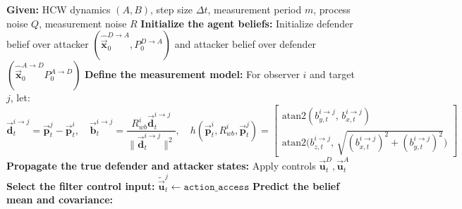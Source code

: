 \begin{algorithm}[H]
\caption{Agent-Centric Bearing-Only Kalman Filter Update}
\label{alg:kf-methodology}
\begin{algorithmic}[1]
\State \textbf{Given:} HCW dynamics $(A,B)$, step size $\Delta t$, measurement period $m$, process noise $Q$, measurement noise $R$
\State \textbf{Initialize the agent beliefs:}
\State \hspace{1em} Initialize defender belief over attacker $(\hat{\vec{\mathbf{x}}}^{D \to A}_0 ,P^{D\to A}_0)$ and attacker belief over defender $(\hat{\vec{\mathbf{x}}}^{A \to D}_0P^{A\to D}_0)$
\State \textbf{Define the measurement model:}
\State \hspace{1em} For observer $i$ and target $j$, let:
\[
\vec{\mathbf{d}}^{i \to j}_t = \vec{\mathbf{p}}^j_t - \vec{\mathbf{p}}^i_t ,\quad
\vec{\mathbf{b}}^{i \to j}_t = \frac{R^i_{wb}\vec{\mathbf{d}}^{i \to j}_t}{\|\vec{\mathbf{d}}^{i \to j}_t\|^2},\quad
h(\vec{\mathbf{p}}_t^i, R_{wb}^i, \vec{\mathbf{p}}_t^j)=
\begin{bmatrix}
\mathrm{atan2}(b_{y,t}^{i\to j},\,b_{x,t}^{i\to j})\\[2pt]
\mathrm{atan2}\!\big(b_{z,t}^{i\to j},\,\sqrt{(b_{x,t}^{i\to j})^2+(b_{y,t}^{i\to j})^2}\big)
\end{bmatrix}
\]
  \State \textbf{Propagate the true defender and attacker states:}
  \State \hspace{1em} Apply controls $\vec{\mathbf{u}}^D_t,\vec{\mathbf{u}}^A_t$
    \State \textbf{Select the filter control input:}
    \State \hspace{1em} $\tilde{\vec{\mathbf{u}}}^j_t\leftarrow \texttt{action\_access}$
    \State \textbf{Predict the belief mean and covariance:}


\end{algorithmic}
\end{algorithm}
